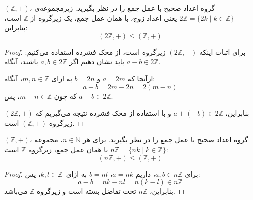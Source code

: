 \begin{example}
    \( (\mathbb{Z}, +) \)، گروه اعداد صحیح با عمل جمع را در نظر بگیرید.  
    زیرمجموعه‌ی \( 2\mathbb{Z} = \{ 2k \mid k \in \mathbb{Z} \} \) یعنی اعداد زوج، با همان عمل جمع، یک زیرگروه از \( \mathbb{Z} \) است، بنابراین:
    \[
        (2\mathbb{Z}, +) \leq (\mathbb{Z}, +)
    \]
\end{example}

\begin{proof}
    برای اثبات اینکه \( (2\mathbb{Z}, +) \) زیرگروه است، از محک فشرده استفاده می‌کنیم:  
    باید نشان دهیم اگر \( a, b \in 2\mathbb{Z} \) باشند، آنگاه \( a - b \in 2\mathbb{Z} \).
    
    ازآنجا که \( a = 2m \) و \( b = 2n \)  به ازای \( m, n \in \mathbb{Z} \)، آنگاه:
    \[
        a - b = 2m - 2n = 2(m - n)
    \]
    که چون \( m - n \in \mathbb{Z} \)، پس \( a - b \in 2\mathbb{Z} \).  
    
    بنابراین، \( a + (-b) \in 2\mathbb{Z} \) و با استفاده از محک فشرده نتیجه می‌گیریم که \( (2\mathbb{Z}, +) \) زیرگروه \( (\mathbb{Z}, +) \) است.
\end{proof}

\begin{example}
    \( (\mathbb{Z}, +) \)، گروه اعداد صحیح با عمل جمع را در نظر بگیرید.  
    برای هر \( n \in \mathbb{N} \)، مجموعه \( n\mathbb{Z} = \{ nk \mid k \in \mathbb{Z} \} \) با همان عمل جمع، زیرگروه \( \mathbb{Z} \) است:
    \[
        (n\mathbb{Z}, +) \leq (\mathbb{Z}, +)
    \]
\end{example}

\begin{proof}
    برای \( a, b \in n\mathbb{Z} \)، داریم \( a = nk \)، \( b = nl \)  به ازای \( k, l \in \mathbb{Z} \)، پس:
    \[
        a - b = nk - nl = n(k - l) \in n\mathbb{Z}
    \]
    بنابراین، \( n\mathbb{Z} \) تحت تفاضل بسته است و زیرگروه \( \mathbb{Z} \) می‌باشد.
\end{proof}


